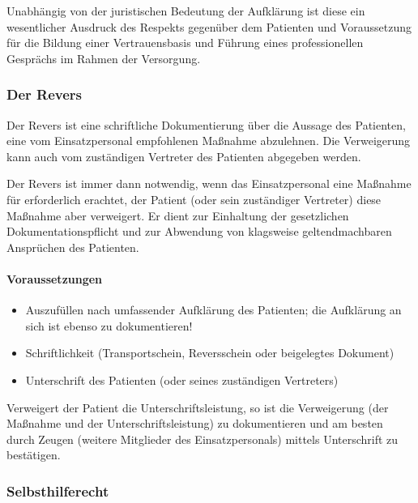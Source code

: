 Unabhängig von der juristischen Bedeutung der Aufklärung ist
diese ein wesentlicher Ausdruck des Respekts gegenüber dem
Patienten und Voraussetzung für die Bildung einer
Vertrauensbasis und Führung eines professionellen Gesprächs
im Rahmen der Versorgung. 

\subsubsection{Der Revers}

\label{topic:revers}


Der Revers ist eine schriftliche Dokumentierung über die
Aussage des Patienten, eine vom Einsatz\-personal
empfohlenen Maßnahme abzulehnen. Die Verweigerung kann auch
vom zuständigen Vertreter des Patienten abgegeben werden.

Der Revers ist immer dann notwendig, wenn das
Einsatzpersonal eine Maßnahme für erforderlich erachtet, der
Patient  (oder sein zuständiger Vertreter) diese Maßnahme
aber verweigert. Er dient zur Einhaltung der gesetzlichen
Dokumentationspflicht und zur Abwendung von  klagsweise
geltendmachbaren Ansprüchen des Patienten.

\paragraph{Voraussetzungen}

\begin{itemize}
  \item Auszufüllen nach umfassender Aufklärung des
  Patienten; die Aufklärung an sich ist ebenso zu
  dokumentieren!
  \item Schriftlichkeit (Transportschein, Reversschein oder
  beigelegtes Dokument)
  \item Unterschrift des Patienten (oder seines zuständigen
  Vertreters)
\end{itemize}

Verweigert der Patient die Unterschriftsleistung, so ist die
Verweigerung (der Maßnahme und der Unterschriftsleistung)
zu dokumentieren und am besten durch Zeugen (weitere
Mitglieder des Einsatzpersonals) mittels
Unterschrift zu bestätigen.



\subsubsection{Selbsthilferecht}
\label{topic:selbsthilferechte}
\label{topic:notstand}
\label{topic:notwehr}
\label{topic:anhalterecht-privater}

